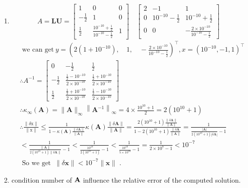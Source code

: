 \documentclass[english,onecolumn]{IEEEtran}
\begin{document}
\begin{enumerate}
    \item 
$$
A=\mathbf{L}\mathbf{U}=\left[\begin{array}{rrr}
1 & 0 & 0 \\
-\frac{1}{2} & 1 & 0 \\
\frac{1}{2} & \frac{10^{-10}+\frac{1}{2}}{10^{-10}-\frac{1}{2}} & 1
\end{array}\right] \quad \left[\begin{array}{ccc}
2 & -1 & 1 \\
0 & 10^{-10}-\frac{1}{2} & 10^{-10}+\frac{1}{2} \\
0 & 0 & -\frac{2 \times 10^{-10}}{10^{-10}-\frac{1}{2}}
\end{array}\right]
$$
$$
\begin{aligned}
&\text { we can get}\   y=\left(2\left(1+10^{-10}\right), \quad 1, \quad-\frac{2 \times 10^{-10}}{10^{-10}-\frac{1}{2}}\right)^{\top}, x=\left(10^{-10},-1,1\right)^{\top}\\
&\therefore A^{-1}=\left[\begin{array}{ccc}
0 & -\frac{1}{2} & \frac{1}{2} \\
-\frac{1}{2} & \frac{\frac{1}{2}-10^{-10}}{2 \times 10^{-10}} & \frac{\frac{1}{2}+10^{-10}}{2 \times 10^{-10}} \\
\frac{1}{2} & \frac{\frac{1}{2}+10^{-10}}{2 \times 10^{-10}} & \frac{\frac{1}{2}-10^{-10}}{2 \times 10^{-10}}
\end{array}\right]\\
&\therefore \kappa_{\infty}(\mathbf{A})=\|\mathbf{A}\|_{\infty}\left\|\mathbf{A}^{-1}\right\|_{\infty}=4 \times \frac{10^{10}+1}{2}=2\left(10^{10}+1\right)\\
&\therefore \frac{\|\delta \mathrm{x}\|}{\|\mathrm{x}\|} \leq \frac{1}{1-\kappa(\mathbf{A}) \frac{\|\delta \mathbf{A}\|}{\|\mathbf{A}\|}} \kappa(\mathbf{A}) \frac{\|\delta \mathbf{A}\|}{\|\mathbf{A}\|}=\frac{2\left(10^{10}+1\right) \frac{\|\delta \mathbf{A}\|}{\|\mathbf{A}\|}}{1-2\left(10^{10}+1\right) \frac{\| \delta \mathbf{A}}{\|\mathbf{A}\|}}=\frac{1}{\frac{|\mathbf{A}|}{2\left(10^{10}+1\right)|\delta \mathbf{A}|}-1}\\
&<\frac{1}{\frac{\|\mathbf{A}\|}{2\left(10^{10}+1\right)\|\delta \mathbf{A}\|}-1}<\frac{1}{\frac{10^{18}}{2\left(10^{10}+1\right)}-1}<\frac{1}{\frac{10^{18}}{5 \times 10^{10}}-1}=\frac{1}{2 \times 10^{7}-1}<10^{-7}\\
&\text { So we get }\ \|\delta \mathbf{x}\|<10^{-7}\|\mathbf{x}\| \text { . }
\end{aligned}
$$


    \item condition number of $\bold A$ influence the relative error of the computed solution.
\end{enumerate}
\end{document}
